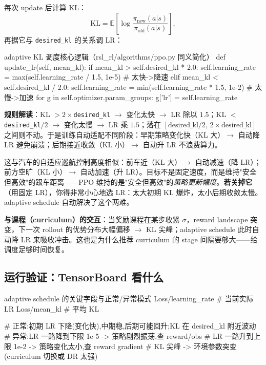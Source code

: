 每次 update 后计算 KL：
\begin{equation}
\mathrm{KL}=\mathbb{E}\!\left[\log\frac{\pi_{\text{new}}(a|s)}{\pi_{\text{old}}(a|s)}\right],
\label{eq:rlmc-kl}
\end{equation}
再据它与 \verb|desired_kl| 的关系调 LR：

\begin{codebox}[Python]{adaptive KL 调度核心逻辑（rsl\_rl/algorithms/ppo.py 同义简化）}
def update_lr(self, mean_kl):
    if mean_kl > self.desired_kl * 2.0:
        self.learning_rate = max(self.learning_rate / 1.5, 1e-5)   # 太快->降速
    elif mean_kl < self.desired_kl / 2.0:
        self.learning_rate = min(self.learning_rate * 1.5, 1e-2)   # 太慢->加速
    for g in self.optimizer.param_groups:
        g['lr'] = self.learning_rate
\end{codebox}

\textbf{规则解读}：KL $>2\times$\verb|desired_kl| $\to$ 变化太快 $\to$ LR 除以 $1.5$；KL $<$ \verb|desired_kl|$/2$ $\to$ 变化太慢 $\to$ LR 乘 $1.5$；落在 $[\text{desired\_kl}/2,\,2\times\text{desired\_kl}]$ 之间则不动。于是训练自动适配不同阶段：早期策略变化快（KL 大）$\to$ 自动降 LR 避免崩溃；后期接近收敛（KL 小）$\to$ 自动升 LR 不浪费算力。

\begin{insight}\label{ins:rlmc-acc}
这与汽车的自适应巡航控制高度相似：前车近（KL 大）$\to$ 自动减速（降 LR）；前方空旷（KL 小）$\to$ 自动加速（升 LR）。目标不是固定速度，而是维持"安全但高效"的跟车距离——PPO 维持的是"安全但高效"的\emph{策略更新幅度}。\textbf{若关掉它}（用固定 LR），你得非常小心地选 LR：太大初期 KL 爆炸，太小后期收敛太慢。adaptive schedule 自动解决了这个两难。
\end{insight}

\textbf{与课程（curriculum）的交互}：当奖励课程在某步收紧 $\sigma$，reward landscape 突变，下一次 rollout 的优势分布大幅偏移 $\to$ KL 尖峰；adaptive schedule 此时自动降 LR 来吸收冲击。这也是为什么推荐 curriculum 的 stage 间隔要够大——给调度足够时间恢复。

\subsection{运行验证：TensorBoard 看什么}

\begin{codebox}{adaptive schedule 的关键字段与正常/异常模式}
Loss/learning_rate   # 当前实际 LR
Loss/mean_kl         # 平均 KL

# 正常:初期 LR 下降(变化快),中期稳,后期可能回升;KL 在 desired_kl 附近波动
# 异常:LR 一路降到下限 1e-5  -> 策略剧烈振荡,查 reward/obs
#      LR 一路升到上限 1e-2  -> 策略变化太小,查 reward gradient
#      KL 尖峰              -> 环境参数突变(curriculum 切换或 DR 太强)
\end{codebox}

